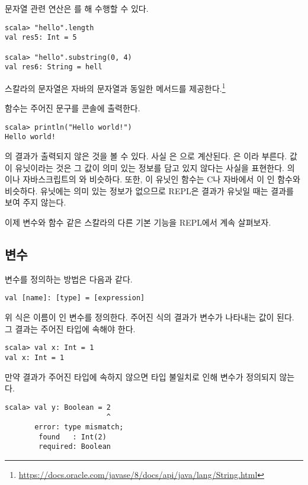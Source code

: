 문자열 관련 연산은 를 해 수행할 수 있다.

\begin{verbatim}
scala> "hello".length
val res5: Int = 5

scala> "hello".substring(0, 4)
val res6: String = hell
\end{verbatim}

스칼라의 문자열은 자바의 문자열과 동일한 메서드를 제공한다.\footnote{\url{https://docs.oracle.com/javase/8/docs/api/java/lang/String.html}}

 함수는 주어진 문구를 콘솔에 출력한다.

\begin{verbatim}
scala> println("Hello world!")
Hello world!
\end{verbatim}

의 결과가 출력되지 않은 것을 볼 수 있다. 사실
은 \code{()}으로
계산된다. \code{()}은 이라 부른다. 값이 유닛이라는 것은 그 값이 의미 있는
정보를 담고 있지 않다는 사실을 표현한다. 의 이나
자바스크립트의 와 비슷하다. 또한, 이 유닛인 함수는 C나 자바에서
이 인 함수와 비슷하다. 유닛에는 의미 있는 정보가 없으므로 REPL은
결과가 유닛일 때는 결과를 보여 주지 않는다.

이제 변수와 함수 같은 스칼라의 다른 기본 기능을 REPL에서 계속 살펴보자.

\subsection{변수}

변수를 정의하는 방법은 다음과 같다.

\begin{verbatim}
val [name]: [type] = [expression]
\end{verbatim}

위 식은 이름이 \code{[name]}인 변수를 정의한다. 주어진 식의 결과가 변수가 나타내는 값이
된다. 그 결과는 주어진 타입에 속해야 한다.

\begin{verbatim}
scala> val x: Int = 1
val x: Int = 1
\end{verbatim}

만약 결과가 주어진 타입에 속하지 않으면 타입 불일치로 인해 변수가 정의되지
않는다.

\begin{verbatim}
scala> val y: Boolean = 2
                        ^
       error: type mismatch;
        found   : Int(2)
        required: Boolean
\end{verbatim}

